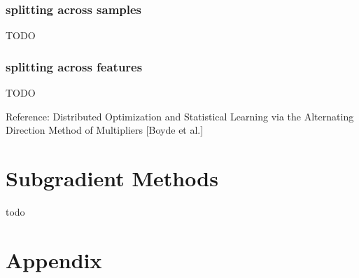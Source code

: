 \documentclass[8pt]{report}
\begin{document}
\begin{multicols*}{2}
  \subsubsection{splitting across samples}
  TODO

  \subsubsection{splitting across features}
  TODO
  
  Reference: Distributed Optimization and Statistical Learning via the Alternating Direction Method of Multipliers [Boyde et al.]
  
  \vfill\null
  
  \pagebreak

  \section{Subgradient Methods}

  todo

  \vfill\null
  
  \pagebreak
  
  \section{Appendix}


\end{multicols*}
\end{document}
